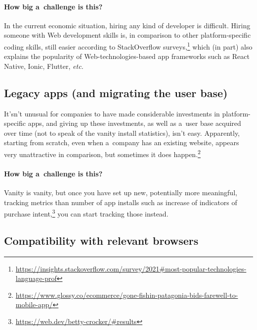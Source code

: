 \documentclass[sigconf]{acmart}
\begin{document}
\paragraph{How big a~challenge is this?}

In the current economic situation, hiring any kind of developer is difficult. Hiring someone with Web development skills is, in comparison to other platform-specific coding skills, still easier according to StackOverflow surveys,\footnote{\url{https://insights.stackoverflow.com/survey/2021\#most-popular-technologies-language-prof}} which (in part) also explains the popularity of Web-technologies-based app frameworks such as React Native, Ionic, Flutter, \textit{etc.}

\subsection{Legacy apps (and migrating the user base)}

It'sn't unusual for companies to have made considerable investments in platform-specific apps, and giving up these investments, as well as a~user base acquired over time (not to speak of the vanity install statistics), isn't easy. Apparently, starting from scratch, even when a~company has an existing website, appears very unattractive in comparison, but sometimes it does happen.\footnote{\url{https://www.glossy.co/ecommerce/gone-fishin-patagonia-bids-farewell-to-mobile-app/}}

\paragraph{How big a~challenge is this?}

Vanity is vanity, but once you have set up new, potentially more meaningful, tracking metrics than number of app installs such as increase of indicators of purchase intent,\footnote{\url{https://web.dev/betty-crocker/\#results}} you can start tracking those instead.

\subsection{Compatibility with relevant browsers}
\end{document}
